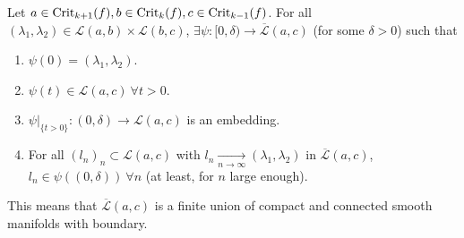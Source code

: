 \begin{theo}
Let $a \in \mathrm{Crit}_{k+1}(f), b \in \mathrm{Crit}_k(f), c \in \mathrm{Crit}_{k-1}(f)$. For all $(\lambda_1,\lambda_2) \in \mathcal{L}(a,b) \times \mathcal{L}(b,c)$, $\exists \psi : [0,\delta) \rightarrow \overline{\mathcal{L}}(a,c)$ (for some $\delta > 0$) such that

\begin{enumerate}
	\item $\psi(0) = (\lambda_1,\lambda_2)$.
	\item $\psi(t) \in \mathcal{L}(a,c) \ \forall t > 0$.
	\item $\left. \psi \right|_{\{t > 0\}} : (0,\delta) \rightarrow \mathcal{L}(a,c)$ is an embedding.
	\item For all $(l_n)_n \subset \mathcal{L}(a,c)$ with $l_n \xrightarrow[n \rightarrow \infty]{} (\lambda_1, \lambda_2)$ in $\overline{\mathcal{L}}(a,c)$, $l_n \in \psi((0,\delta)) \ \forall n$ (at least, for $n$ large enough).
\end{enumerate}

This means that $\overline{\mathcal{L}}(a,c)$ is a finite union of compact and connected smooth manifolds with boundary.
\end{theo}

